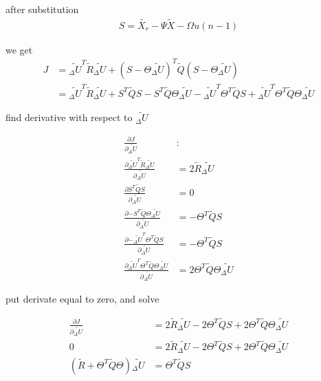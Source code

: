 \documentclass[12pt,twoside,onecolumn,openany,extrafontsizes,dvipsnames]{memoir}
\begin{document}
        after substitution
        \begin{align*}
            S = \tilde{X_r} - \Psi\tilde{X} - \Omega u(n-1)
        \end{align*}

        we get
        \begin{align*}
            J &= \tilde{_\Delta U}^T \tilde{R} \tilde{_\Delta U} + (S -  \Theta \tilde{_\Delta U} )^T \tilde{Q} (S -  \Theta \tilde{_\Delta U} ) \\
                        &= \tilde{_\Delta U}^T \tilde{R} \tilde{_\Delta U} 
                        + S^T\tilde{Q}S - S^T \tilde{Q} \Theta \tilde{_\Delta U} 
                        - \tilde{_\Delta U}^T \Theta^T\tilde{Q}S + \tilde{_\Delta U}^T\Theta^T\tilde{Q}\Theta\tilde{_\Delta U}
        \end{align*}

        \newpage
        find derivative with respect to $\tilde{_\Delta U}$ 

        \begin{align*}  
            \frac{\partial J}{\partial {\tilde{_\Delta U}}} & : \\
            \frac{\partial {\tilde{_\Delta U}^T \tilde{R} \tilde{_\Delta U} } }{\partial {\tilde{_\Delta U}}} & = 2\tilde{R}\tilde{_\Delta U} \\
            \frac{\partial {S^T\tilde{Q}S}}{\partial {\tilde{_\Delta U}}} & = 0 \\
            \frac{\partial {- S^T \tilde{Q} \Theta \tilde{_\Delta U} }}{\partial {\tilde{_\Delta U}}} & = -\Theta^T\tilde{Q}S \\
            \frac{\partial {- \tilde{_\Delta U}^T \Theta^T\tilde{Q}S}}{\partial {\tilde{_\Delta U}}} & = -\Theta^T\tilde{Q}S \\
            \frac{\partial { \tilde{_\Delta U}^T\Theta^T\tilde{Q}\Theta\tilde{_\Delta U}}}{\partial {\tilde{_\Delta U}}} & = 2\Theta^T\tilde{Q}\Theta\tilde{_\Delta U}
        \end{align*}  


        put derivate equal to zero, and solve

        \begin{align*}
          \frac{\partial J}{\partial {\tilde{_\Delta U}}} & = 2 \tilde{R} \tilde{_\Delta U} - 2\Theta^T\tilde{Q}S + 2\Theta^T\tilde{Q}\Theta\tilde{_\Delta U} \\
          0 &= 2 \tilde{R} \tilde{_\Delta U} - 2\Theta^T\tilde{Q}S + 2\Theta^T\tilde{Q}\Theta\tilde{_\Delta U} \\
          (\tilde{R} + \Theta^T\tilde{Q}\Theta)\tilde{_\Delta U}  &= \Theta^T\tilde{Q}S 
        \end{align*}  
      
\end{document}

